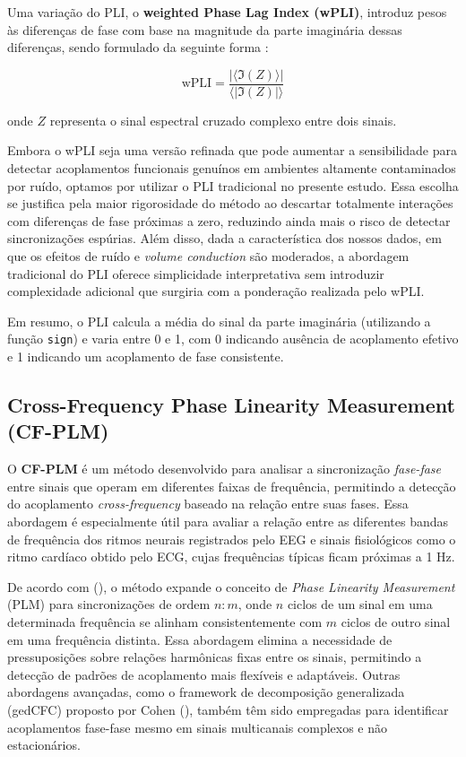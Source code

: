 Uma variação do PLI, o \textbf{weighted Phase Lag Index (wPLI)}, introduz pesos às diferenças de fase com base na magnitude da parte imaginária dessas diferenças, sendo formulado da seguinte forma \cite{seraj2018cerebral}:

\[
\text{wPLI} = \frac{|\langle \Im(Z) \rangle|}{\langle |\Im(Z)| \rangle}
\]

onde \(Z\) representa o sinal espectral cruzado complexo entre dois sinais.

Embora o wPLI seja uma versão refinada que pode aumentar a sensibilidade para detectar acoplamentos funcionais genuínos em ambientes altamente contaminados por ruído, optamos por utilizar o PLI tradicional no presente estudo. Essa escolha se justifica pela maior rigorosidade do método ao descartar totalmente interações com diferenças de fase próximas a zero, reduzindo ainda mais o risco de detectar sincronizações espúrias. Além disso, dada a característica dos nossos dados, em que os efeitos de ruído e \textit{volume conduction} são moderados, a abordagem tradicional do PLI oferece simplicidade interpretativa sem introduzir complexidade adicional que surgiria com a ponderação realizada pelo wPLI.

Em resumo, o PLI calcula a média do sinal da parte imaginária (utilizando a função \texttt{sign}) e varia entre 0 e 1, com 0 indicando ausência de acoplamento efetivo e 1 indicando um acoplamento de fase consistente.

\subsection{Cross-Frequency Phase Linearity Measurement (CF-PLM)}

O \textbf{CF-PLM} é um método desenvolvido para analisar a sincronização \textit{fase-fase} entre sinais que operam em diferentes faixas de frequência, permitindo a detecção do acoplamento \textit{cross-frequency} baseado na relação entre suas fases. Essa abordagem é especialmente útil para avaliar a relação entre as diferentes bandas de frequência dos ritmos neurais registrados pelo EEG e sinais fisiológicos como o ritmo cardíaco obtido pelo ECG, cujas frequências típicas ficam próximas a 1 Hz.

De acordo com \citeauthor{sorrentino2022detection} (\citeyear{sorrentino2022detection}), o método expande o conceito de \textit{Phase Linearity Measurement} (PLM) para sincronizações de ordem \(n:m\), onde \(n\) ciclos de um sinal em uma determinada frequência se alinham consistentemente com \(m\) ciclos de outro sinal em uma frequência distinta. Essa abordagem elimina a necessidade de pressuposições sobre relações harmônicas fixas entre os sinais, permitindo a detecção de padrões de acoplamento mais flexíveis e adaptáveis. Outras abordagens avançadas, como o framework de decomposição generalizada (gedCFC) proposto por Cohen (\citeyear{cohen2017multivariate}), também têm sido empregadas para identificar acoplamentos fase-fase mesmo em sinais multicanais complexos e não estacionários.


